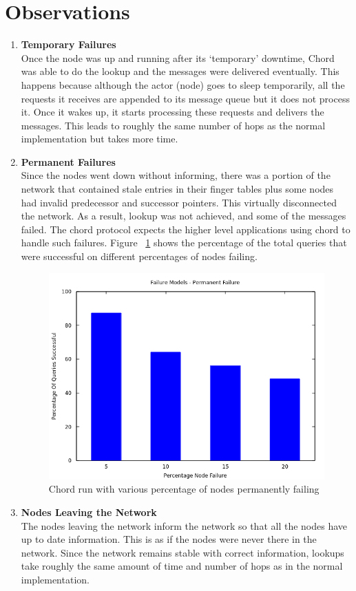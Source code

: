 \documentclass[11pt]{article}
\begin{document}
\section{Observations}
\begin{enumerate}
\item {\bf Temporary Failures}\\
Once the node was up and running after its `temporary' downtime, Chord was able to do the lookup and the messages were delivered eventually. This happens because although the actor (node) goes to sleep temporarily, all the requests it receives are appended to its message queue but it does not process it. Once it wakes up, it starts processing these requests and delivers the messages. This leads to roughly the same number of hops as the normal implementation but takes more time.

\item {\bf Permanent Failures}\\
Since the nodes went down without informing, there was a portion of the network that contained stale entries in their finger tables plus some nodes had invalid predecessor and successor pointers. This virtually disconnected the network. As a result, lookup was not achieved, and some of the messages failed. The chord protocol expects the higher level applications using chord to handle such failures. Figure ~\ref{failure} shows the percentage of the total queries that were successful on different percentages of nodes failing.
\begin{figure}[h]
    \includegraphics[scale=0.75]{images/permanentfailures.png}
    \caption{Chord run with various percentage of nodes permanently failing}
    \label{failure}
\end{figure}
\item {\bf Nodes Leaving the Network}\\
The nodes leaving the network inform the network so that all the nodes have up to date information. This is as if the nodes were never there in the network. Since the network remains stable with correct information, lookups take roughly the same amount of time and number of hops as in the normal implementation.
\end{enumerate}
\end{document}
